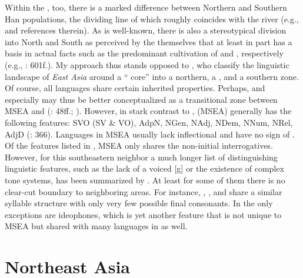 \noindent Within the , too, there is a marked difference between Northern and Southern Han populations, the dividing line of which roughly coincides with the  river (e.g., \citealt{Zhao2014} and references therein). As is well-known, there is also a stereotypical division into North and South as perceived by the  themselves that at least in part has a basis in actual facts such as the predominant cultivation of  and , respectively (e.g., \citealt{Eberhard1965}: 601f.). My approach thus stands opposed to \citet[870]{HeggartyRenfrew2014b}, who classify the linguistic landscape of \textit{East Asia} around a “ core” into a northern, a , and a southern zone. Of course, all  languages share certain inherited properties. Perhaps,  and especially  may thus be better conceptualized as a transitional zone between MSEA and  (\citealt{Dryer2003}: 48ff.; \citealt{Comrie2008}). However, in stark contrast to ,  (MSEA) generally has the following  features: SVO (SV \& VO), AdpN, NGen, NAdj, NDem, NNum, NRel, AdjD (\citealt{deSousa2015}: 366). Languages in MSEA usually lack inflectional  and have no sign of . Of the features listed in , MSEA only shares the non-initial interrogatives. However, for this southeastern neighbor a much longer list of distinguishing linguistic features, such as the lack of a voiced [g] or the existence of complex tone systems, has been summarized by \cite[7f.]{EnfieldComrie2015}. At least for some of them there is no clear-cut boundary to neighboring areas. For instance, , , and  share a similar syllable structure with only very few possible final consonants. In  the only exceptions are ideophones, which is yet another feature that is not unique to MSEA but shared with many languages in  as well.

\section{Northeast Asia}\label{sec:3.4}

